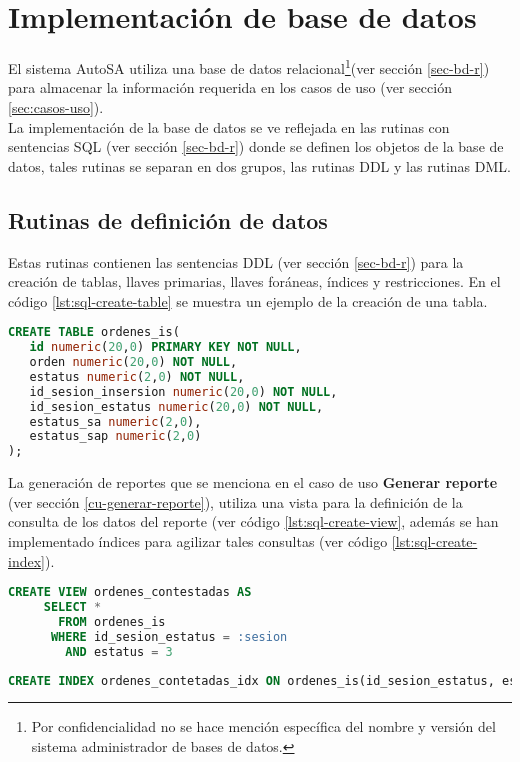 \section{Implementación de base de datos}
El sistema AutoSA utiliza una base de datos relacional\footnote{Por confidencialidad no se hace mención específica del nombre y versión del sistema administrador de bases de datos.}(ver sección \ref{sec-bd-r}) para almacenar la información requerida en los casos de uso (ver sección \ref{sec:casos-uso}).\\
La implementación de la base de datos se ve reflejada en las rutinas con sentencias SQL (ver sección \ref{sec-bd-r}) donde se definen los objetos de la base de datos, tales rutinas se separan en dos grupos, las rutinas DDL y las rutinas DML.

\subsection{Rutinas de definición de datos}
Estas rutinas contienen las sentencias DDL (ver sección \ref{sec-bd-r}) para la creación de tablas, llaves primarias, llaves foráneas, índices y restricciones. En el código \ref{lst:sql-create-table} se muestra un ejemplo de la creación de una tabla.
\begin{lstlisting}[language=SQL, caption={Sentencia para crear una tabla.}, label={lst:sql-create-table}]
CREATE TABLE ordenes_is(
   id numeric(20,0) PRIMARY KEY NOT NULL,
   orden numeric(20,0) NOT NULL,
   estatus numeric(2,0) NOT NULL,
   id_sesion_insersion numeric(20,0) NOT NULL,
   id_sesion_estatus numeric(20,0) NOT NULL,
   estatus_sa numeric(2,0),
   estatus_sap numeric(2,0)
);
\end{lstlisting}

La generación de reportes que se menciona en el caso de uso \textbf{Generar reporte} (ver sección \ref{cu-generar-reporte}), utiliza una vista para la definición de la consulta de los datos del reporte (ver código \ref{lst:sql-create-view}, además se han implementado índices para agilizar tales consultas (ver código \ref{lst:sql-create-index}).

\begin{lstlisting}[language=SQL, caption={Sentencia para crear una vista.}, label={lst:sql-create-view}]
CREATE VIEW ordenes_contestadas AS
     SELECT *
       FROM ordenes_is
      WHERE id_sesion_estatus = :sesion
        AND estatus = 3
\end{lstlisting}

\begin{lstlisting}[language=SQL, caption={Sentencia para crear un índice.}, label={lst:sql-create-index}]
CREATE INDEX ordenes_contetadas_idx ON ordenes_is(id_sesion_estatus, estatus);
\end{lstlisting}


